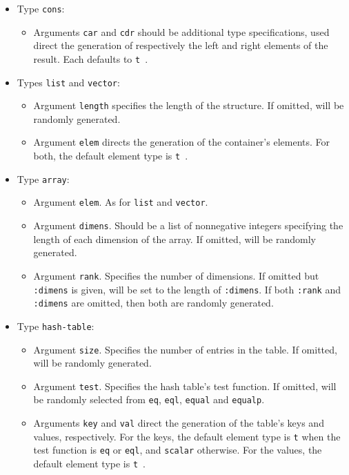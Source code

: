 \begin{itemize}
\item Type \texttt{cons}:
  \begin{itemize}
  \item Arguments \texttt{car} and \texttt{cdr} should be additional
    type specifications, used direct the generation of respectively
    the left and right elements of the result.  Each defaults to
    \texttt{t}~.
  \end{itemize}
  
\item Types \texttt{list} and \texttt{vector}:
  \begin{itemize}
  \item Argument \texttt{length} specifies the length of the structure.
    If omitted, will be randomly generated.
  \item Argument \texttt{elem} directs the generation of the
    container's elements.  For both, the default element type is
    \texttt{t}~.
  \end{itemize}
  
\item Type \texttt{array}:
  \begin{itemize}
  \item Argument \texttt{elem}.  As for \texttt{list} and
    \texttt{vector}.
  \item Argument \texttt{dimens}.  Should be a list of nonnegative
    integers specifying the length of each dimension of the array.  If
    omitted, will be randomly generated.
  \item Argument \texttt{rank}.  Specifies the number of dimensions.
    If omitted but \texttt{:dimens} is given, will be set to the
    length of \texttt{:dimens}.  If both \texttt{:rank} and
    \texttt{:dimens} are omitted, then both are randomly generated.
  \end{itemize}
  
\item Type \texttt{hash-table}:
  \begin{itemize}
  \item Argument \texttt{size}.  Specifies the number of entries in
    the table.  If omitted, will be randomly generated.
  \item Argument \texttt{test}.  Specifies the hash table's test
    function.  If omitted, will be randomly selected from \texttt{eq},
    \texttt{eql}, \texttt{equal} and \texttt{equalp}.
  \item Arguments \texttt{key} and \texttt{val} direct the generation
    of the table's keys and values, respectively.  For the keys, the
    default element type is \texttt{t} when the test function is
    \texttt{eq} or \texttt{eql}, and \texttt{scalar} otherwise.  For
    the values, the default element type is \texttt{t}~.
  \end{itemize}
\end{itemize}

